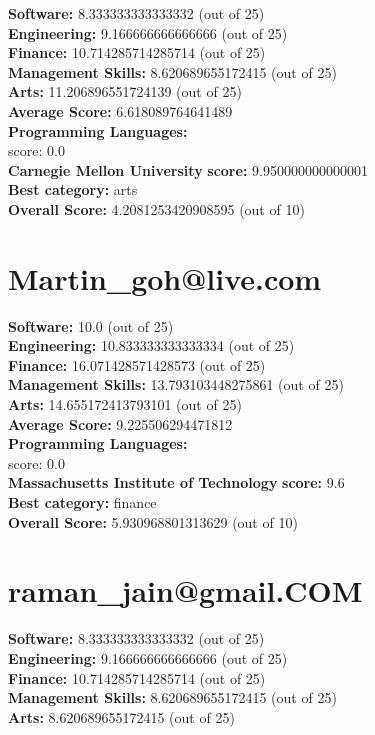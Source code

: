 \documentclass{article}
\begin{document}
\textbf{Software:} 8.333333333333332 (out of 25)\\
\textbf{Engineering: } 9.166666666666666 (out of 25)\\
\textbf{Finance:} 10.714285714285714 (out of 25)\\
\textbf{Management Skills:} 8.620689655172415 (out of 25)\\
\textbf{Arts:} 11.206896551724139 (out of 25)\\
\textbf{Average Score: } 6.618089764641489\\
\textbf{Programming Languages:} \\
score: 0.0\\
\textbf{Carnegie Mellon University} \textbf{score:} 9.950000000000001\\
\textbf{Best category: } arts\\
\textbf{Overall Score: }4.2081253420908595 (out of 10)\section{Martin_goh@live.com}
\textbf{Software:} 10.0 (out of 25)\\
\textbf{Engineering: } 10.833333333333334 (out of 25)\\
\textbf{Finance:} 16.071428571428573 (out of 25)\\
\textbf{Management Skills:} 13.793103448275861 (out of 25)\\
\textbf{Arts:} 14.655172413793101 (out of 25)\\
\textbf{Average Score: } 9.225506294471812\\
\textbf{Programming Languages:} \\
score: 0.0\\
\textbf{Massachusetts Institute of Technology} \textbf{score:} 9.6\\
\textbf{Best category: } finance\\
\textbf{Overall Score: }5.930968801313629 (out of 10)\section{raman_jain@gmail.COM}
\textbf{Software:} 8.333333333333332 (out of 25)\\
\textbf{Engineering: } 9.166666666666666 (out of 25)\\
\textbf{Finance:} 10.714285714285714 (out of 25)\\
\textbf{Management Skills:} 8.620689655172415 (out of 25)\\
\textbf{Arts:} 8.620689655172415 (out of 25)\\
\end{document}
